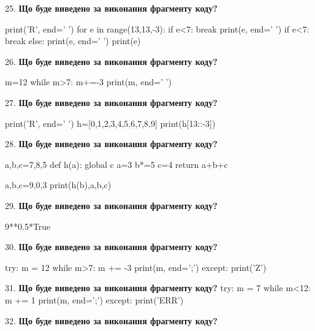 \documentclass[11pt]{article}
\begin{document}
25. \textbf{Що буде виведено за виконання фрагменту коду?}

print('R', end=' ')
for e in range(13,13,-3):
    if e<7:
        break
        print(e, end=' ')
    if e<7:
        break
    else:
        print(e, end=' ')
    print(e)
\par\vspace{5mm}

26. \textbf{Що буде виведено за виконання фрагменту коду?}

m=12
while m>7:
    m+=-3
print(m, end=' ')

\par\vspace{5mm}

27. \textbf{Що буде виведено за виконання фрагменту коду?}

print('R', end=' ')
h=[0,1,2,3,4,5,6,7,8,9]
print(h[13::-3])

\par\vspace{5mm}

28. \textbf{Що буде виведено за виконання фрагменту коду?}

a,b,c=7,8,5
def h(a):
global c    a=3
    b*=5
    c=4
    return a+b+c

a,b,c=9,0,3
print(h(b),a,b,c)
\par\vspace{5mm}

29. \textbf{Що буде виведено за виконання фрагменту коду?}

9**0.5*True
\par\vspace{5mm}

30. \textbf{Що буде виведено за виконання фрагменту коду?}

try:
    m = 12
    while m>7:
        m += -3
    print(m, end=';')
except:
    print('Z')

\par\vspace{5mm}

31. \textbf{Що буде виведено за виконання фрагменту коду?}
try:
    m = 7
    while m<12:
        m += 1
    print(m, end=';')
except:
    print('ERR')
\par\vspace{5mm}

32. \textbf{Що буде виведено за виконання фрагменту коду?}
\end{document}
